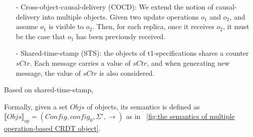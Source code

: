 \begin{itemize}
\setlength{\itemsep}{0.5pt}
\item[-] Cross-object-causal-delivery (COCD): We extend the notion of causal-delivery into multiple objects. Given two update operations $o_1$ and $o_2$, and assume $o_1$ is visible to $o_2$. Then, for each replica, once it receives $o_2$, it must be the case that $o_1$ has been previously received.

\item[-] Shared-time-stamp (STS): the objects of t1-specifications shares a counter $\mathit{sCtr}$. Each message carries a value of $\mathit{sCtr}$, and when generating new message, the value of $\mathit{sCtr}$ is also considered.  
\end{itemize} 



Based on shared-time-stamp, 



Formally, given a set $\mathit{Objs}$ of objects, its semantics is defined as $\llbracket \mathit{Objs} \rrbracket_{\mathit{op}} = (\mathit{Config},\mathit{config}_0,\Sigma',\rightarrow)$ as in \figurename~\ref{fig:the semantics of multiple operation-based CRDT object}. 


